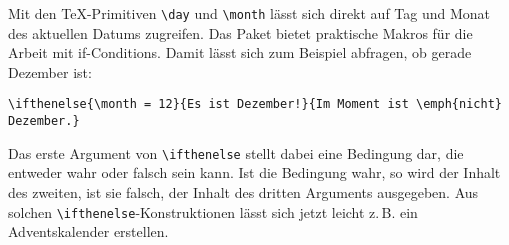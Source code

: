 % 

\noindent Mit den \TeX-Primitiven \texttt{\textbackslash day} und \texttt{\textbackslash month} lässt sich direkt auf Tag und Monat des aktuellen Datums zugreifen. Das Paket  bietet praktische Makros für die Arbeit mit if-Conditions. Damit lässt sich zum Beispiel abfragen, ob gerade Dezember ist:

\begin{lstlisting}
\ifthenelse{\month = 12}{Es ist Dezember!}{Im Moment ist \emph{nicht} Dezember.}
\end{lstlisting}

\noindent Das erste Argument von \texttt{\textbackslash ifthenelse} stellt dabei eine Bedingung dar, die entweder wahr oder falsch sein kann. Ist die Bedingung wahr, so wird der Inhalt des zweiten, ist sie falsch, der Inhalt des dritten Arguments ausgegeben. Aus solchen \texttt{\textbackslash ifthenelse}-Konstruktionen lässt sich jetzt leicht z.\,B. ein Adventskalender erstellen.
